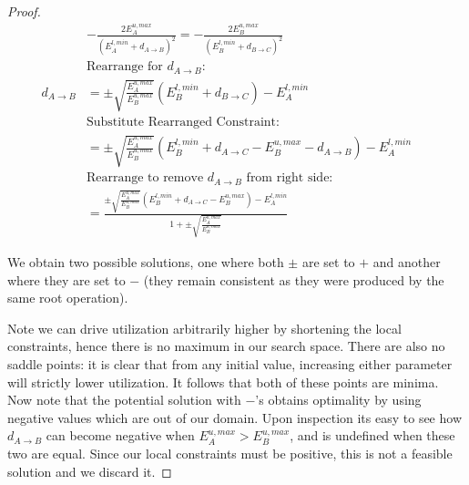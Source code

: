 \begin{proof}
	\begin{align*}
		&-\frac{2 E^{u,max}_A}{(E^{l,min}_A+d_{A \to B})^2} = -\frac{2 E^{u,max}_B}{(E^{l,min}_B+d_{B \to C})^2} &\mbox{}&\\
		& \mbox{Rearrange for $d_{A \to B}$:} & &\\
		d_{A \to B} &= \pm\sqrt{\frac{E^{u,max}_A}{E^{u,max}_B}} \left(E^{l,min}_B+d_{B \to C}\right)-E^{l,min}_A &\mbox{}&\\ %
		& \mbox{Substitute Rearranged Constraint:} & &\\
		&=\pm\sqrt{\frac{E^{u,max}_A}{E^{u,max}_B}} \left(E^{l,min}_B+d_{A \to C}-E^{u,max}_B-d_{A \to B}\right)-E^{l,min}_A &\mbox{}&\\ %
		& \mbox{Rearrange to remove $d_{A \to B}$ from right side:} & &\\
		&=\frac{\pm\sqrt{\frac{E^{u,max}_A}{E^{u,max}_B}} (E^{l,min}_B+d_{A \to C}-E^{u,max}_B)-E^{l,min}_A}{1+\pm\sqrt{\frac{E^{u,max}_A}{E^{u,max}_B}}} &\mbox{}& %
	\end{align*}
	
	We obtain two possible solutions, one where both $\pm$ are set to $+$ and another where they are set to $-$ (they remain consistent as they were produced by the same root operation).
	
	
	Note we can drive utilization arbitrarily higher by shortening the local constraints, hence there is no maximum in our search space. There are also no saddle points: it is clear that from any initial value, increasing either parameter will strictly lower utilization. It follows that both of these points are minima. Now note that the potential solution with $-$'s obtains optimality by using negative values which are out of our domain. Upon inspection its easy to see how $d_{A \to B}$ can become negative when $E_A^{u,max} > E_B^{u,max}$, and is undefined when these two are equal. Since our local constraints must be positive, this is not a feasible solution and we discard it.
	

\end{proof}
